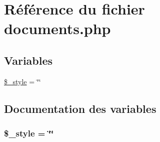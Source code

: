 \hypertarget{documents_8php}{
\section{R\'{e}f\'{e}rence du fichier documents.php}
\label{documents_8php}
}
\subsection*{Variables}
\begin{CompactItemize}
\item 
\hyperlink{documents_8php_a0}{\$\_\-style} = \char`\"{}\char`\"{}
\end{CompactItemize}


\subsection{Documentation des variables}
\hypertarget{documents_8php_a0}{
\subsubsection[\$\_\-style]{\setlength{\rightskip}{0pt plus 5cm}\$\_\-style = \char`\"{}\char`\"{}}}
\label{documents_8php_a0}


